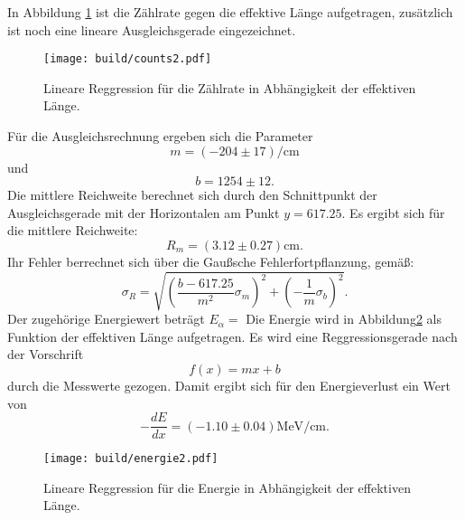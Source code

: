 \noindent In Abbildung \ref{fig:c2} ist die Zählrate gegen die effektive Länge aufgetragen, zusätzlich ist noch eine lineare Ausgleichsgerade eingezeichnet.
\begin{figure}[H]
  \centering
  \texttt{[image: build/counts2.pdf]}
  \caption{Lineare Reggression für die Zählrate in Abhängigkeit der effektiven Länge.}
  \label{fig:c2}
\end{figure}
\noindent Für die Ausgleichsrechnung ergeben sich die Parameter
\begin{equation*}
  m =(-204\pm17)\si{\per\centi\meter}
\end{equation*}
und
\begin{equation*}
  b = 1254\pm12   .
\end{equation*}
Die mittlere Reichweite berechnet sich durch den Schnittpunkt der Ausgleichsgerade mit der Horizontalen am Punkt $y=617.25$.
Es ergibt sich für die mittlere Reichweite:
\begin{equation}
  R_m=(3.12\pm0.27)\si{\centi\meter} .
\end{equation}
Ihr Fehler berrechnet sich über die Gaußsche Fehlerfortpflanzung, gemäß:
\begin{equation*}
    \sigma_R = \sqrt{(\frac{b-617.25}{m^2}\sigma_m)^2 +(-\frac{1}{m}\sigma_b)^2} .
\end{equation*}
Der zugehörige Energiewert beträgt $E_{\alpha}=$
Die Energie wird in Abbildung\ref{fig:e2} als Funktion der effektiven Länge aufgetragen.
Es wird eine Reggressionsgerade nach der Vorschrift
\begin{equation*}
  f(x) = mx + b
\end{equation*}
durch die Messwerte gezogen.
Damit ergibt sich für den Energieverlust ein Wert von
\begin{equation*}
  -\frac{dE}{dx} =(-1.10\pm0.04)\si{\mega\electronvolt\per\centi\meter} .
\end{equation*}

\begin{figure}[H]
  \centering
  \texttt{[image: build/energie2.pdf]}
  \caption{Lineare Reggression für die Energie in Abhängigkeit der effektiven Länge.}
  \label{fig:e2}
\end{figure}

